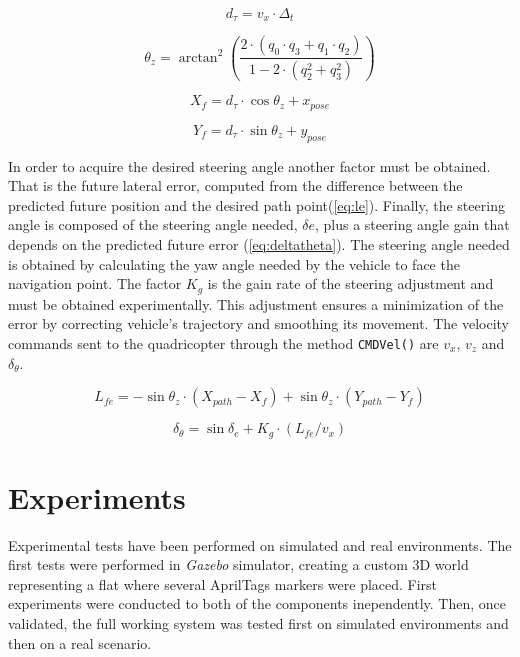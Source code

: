 \documentclass{styles/svproc}
\begin{document}
	\begin{equation}
	d_{\tau} = v_{x} \cdot \Delta_{t}
	\label{eq:dtau}
	\end{equation}

	\begin{equation}
	\theta_{z} = \arctan^2 \left( \frac{2 \cdot (q_{0} \cdot q_{3} +q_{1} \cdot q_{2})}{1-2 \cdot (q_{2}^2 + q_{3}^2)}\right)
	\label{eq:euler}
	\end{equation}		
	
	\begin{equation}
	X_{f} = d_{\tau} \cdot \cos \theta_{z} + x_{pose}
	\label{eq:xf}
	\end{equation}
	
	\begin{equation}
	Y_{f} = d_{\tau} \cdot \sin \theta_{z} + y_{pose}
	\label{eq:yf}
	\end{equation}
	
	In order to acquire the desired steering angle another factor must be obtained. That is the future lateral error, computed from the difference between the predicted future position and the desired path point(\ref{eq:le}). Finally, the steering angle is composed of the steering angle needed, $\delta{e}$, plus a steering angle gain that depends on the predicted future error (\ref{eq:deltatheta}). The steering angle needed is obtained by calculating the yaw angle needed by the vehicle to face the navigation point. The factor $K_{g}$ is the gain rate of the steering adjustment and must be obtained experimentally. This adjustment ensures a minimization of the error by correcting vehicle's trajectory and smoothing its movement. The velocity commands sent to the quadricopter through the method \texttt{CMDVel()} are $v_{x}$, $v_{z}$ and $\delta_{\theta}$. 

	\begin{equation}
	L_{fe} = - \sin \theta_{z} \cdot ( X_{path} - X_{f} ) + \sin \theta_{z} \cdot ( Y_{path} - Y_{f} )
	\label{eq:le}
	\end{equation}

	\begin{equation}
	\delta_{\theta} = \sin \delta_{e} +  K_{g} \cdot ( L_{fe} / v_{x} )
	\label{eq:deltatheta}
	\end{equation}

\section{Experiments}

	Experimental tests have been performed on simulated and real environments. The first tests were performed in \textit{Gazebo} simulator, creating a custom 3D world representing a flat where several AprilTags markers were placed. First experiments were conducted to both of the components inependently. Then, once validated, the full working system was tested first on simulated environments and then on a real scenario.
	
\end{document}
